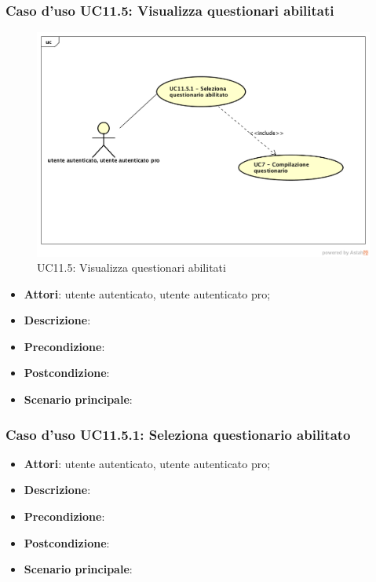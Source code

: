 \subsubsection{Caso d'uso UC11.5: Visualizza questionari abilitati}
\label{UC11.5}
\begin{figure}[h]
	\centering
	\includegraphics[scale=0.5]{UML/UC11_5.png}
	\caption{UC11.5: Visualizza questionari abilitati}
\end{figure}
\begin{itemize}
\item\textbf{Attori}: utente autenticato, utente autenticato pro;
\item\textbf{Descrizione}: 
\item\textbf{Precondizione}:
\item\textbf{Postcondizione}: 
\item\textbf{Scenario principale}: 
\end{itemize}

\subsubsection{Caso d'uso UC11.5.1: Seleziona questionario abilitato}
\begin{itemize}
\item\textbf{Attori}: utente autenticato, utente autenticato pro;
\item\textbf{Descrizione}: 
\item\textbf{Precondizione}:
\item\textbf{Postcondizione}: 
\item\textbf{Scenario principale}: 
\end{itemize}